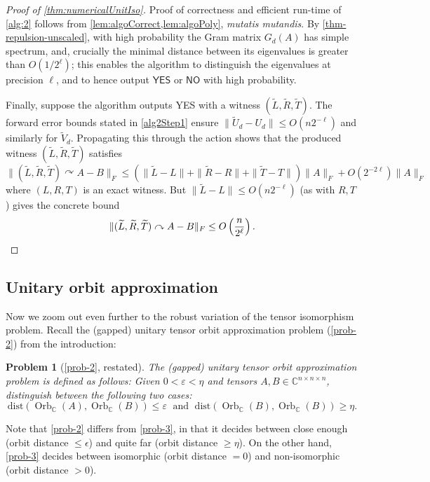 \documentclass[11pt]{article}
\numberwithin{equation}{section}
\newtheorem*{problem*}{\bf Problem}
\theoremstyle{remark}
\DeclareMathOperator{\Orb}{Orb}
\newcommand{\C}{\mathbb{C}}
\newcommand{\dist}{\mathrm{dist}}
\begin{document}
\begin{proof}[Proof of \cref{thm:numericalUnitIso}]
       Proof of correctness and efficient run-time of \cref{alg:2} follows from \cref{lem:algoCorrect,lem:algoPoly}, \textit{mutatis mutandis}.
       By \cref{thm-repulsion-unscaled}, with high probability the Gram matrix $G_d(A)$ has simple spectrum, and, crucially the minimal distance between its eigenvalues is greater than $O(1/2^\ell)$; this enables the algorithm to distinguish the eigenvalues at precision $\ell$, and to hence output $\textsf{YES}$ or $\textsf{NO}$ with high probability.

       Finally, suppose the algorithm outputs \textsf{YES} with a witness $(\widetilde{L}, \widetilde{R}, \widetilde{T})$. The forward error bounds stated in \ref{alg2Step1} ensure $\|\widetilde{U}_d - U_d\| \leq O(n 2^{-\ell})$ and similarly for $\widetilde{V}_d$. Propagating this through the action shows that the produced witness $(\widetilde{L},\widetilde{R},\widetilde{T})$ satisfies
       \[
       \|(\widetilde{L},\widetilde{R},\widetilde{T}) \curvearrowright A-B \|_F \leq \left( \|\widetilde{L} - L\| + \|\widetilde{R} - R\| + \|\widetilde{T} - T\| \right)\|A\|_F + O(2^{-2\ell}) \|A\|_F
       \]
       where $(L, R, T)$ is an exact witness. But $\|\widetilde{L}- L\|\leq O(n2^{-\ell})$ (as with $R, T$) gives the concrete bound
       \[
       \|(\widetilde{L},\widetilde{R},\widetilde{T}) \curvearrowright A - B\|_F \leq O\left(\frac{n}{2^\ell}\right). \qedhere
       \]
\end{proof}




\subsection{Unitary orbit approximation}\label{sec:RobustOrthogonalProblem}
Now we zoom out even further to the robust variation of the tensor isomorphism problem. 
Recall the (gapped) unitary tensor orbit approximation problem 
(\cref{prob-2})
from the introduction:
\begin{problem*}[\cref{prob-2}, restated]
The \emph{(gapped) unitary tensor orbit approximation problem} is defined as follows: Given $0<\varepsilon<\eta$ and tensors  $A,B \in \C^{n\times n \times n}$, distinguish between the following two cases:
\[
\dist(\Orb_\C(A), \Orb_\C(B)) \leq \varepsilon \;\text{ and }\; \dist(\Orb_\C(B), \Orb_\C(B)) \geq \eta.
\]
\end{problem*}

Note that \cref{prob-2} differs from \cref{prob-3}, in that it decides between close enough (orbit distance $\leq \epsilon$) and quite far (orbit distance $\geq \eta$). On the other hand, \cref{prob-3} decides between isomorphic (orbit distance $=0$) and non-isomorphic (orbit distance $>0$). 
\end{document}
